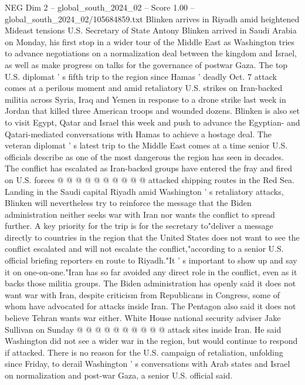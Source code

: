 \begin{textsample}{NEG Dim 2 – global\_south\_2024\_02 – Score 1.00 – global\_south\_2024\_02/105684859.txt}  \label{ex:f2_neg_414}
Blinken arrives in Riyadh amid heightened Mideast tensions U.S.
Secretary of State Antony Blinken arrived in Saudi Arabia on Monday, his first stop in a wider tour of the Middle East as Washington tries to advance negotiations on a normalization deal between the kingdom and Israel, as well as make progress on talks for the governance of postwar Gaza.
The top U.S. diplomat ' s fifth trip to the region since Hamas ' deadly Oct. 7 attack comes at a perilous moment and amid retaliatory U.S. strikes on Iran-backed militia across Syria, Iraq and Yemen in response to a drone strike last week in Jordan that killed three American troops and wounded dozens.
Blinken is also set to visit Egypt, Qatar and Israel this week and push to advance the Egyptian- and Qatari-mediated conversations with Hamas to achieve a hostage deal.
The veteran diplomat ' s latest trip to the Middle East comes at a time senior U.S. officials describe as one of the most dangerous the region has seen in decades.
The conflict has escalated as Iran-backed groups have entered the fray and fired on U.S. forces @ @ @ @ @ @ @ @ @ @ attacked shipping routes in the Red Sea.
Landing in the Saudi capital Riyadh amid Washington ' s retaliatory attacks, Blinken will nevertheless try to reinforce the message that the Biden administration neither seeks war with Iran nor wants the conflict to spread further.
A key priority for the trip is for the secretary to"deliver a message directly to countries in the region that the United States does not want to see the conflict escalated and will not escalate the conflict,"according to a senior U.S. official briefing reporters en route to Riyadh."It ' s important to show up and say it on one-on-one."Iran has so far avoided any direct role in the conflict, even as it backs those militia groups.
The Biden administration has openly said it does not want war with Iran, despite criticism from Republicans in Congress, some of whom have advocated for attacks inside Iran.
The Pentagon also said it does not believe Tehran wants war either.
White House national security adviser Jake Sullivan on Sunday @ @ @ @ @ @ @ @ @ @ attack sites inside Iran.
He said Washington did not see a wider war in the region, but would continue to respond if attacked.
There is no reason for the U.S. campaign of retaliation, unfolding since Friday, to derail Washington ' s conversations with Arab states and Israel on normalization and post-war Gaza, a senior U.S. official said.

\end{textsample}
